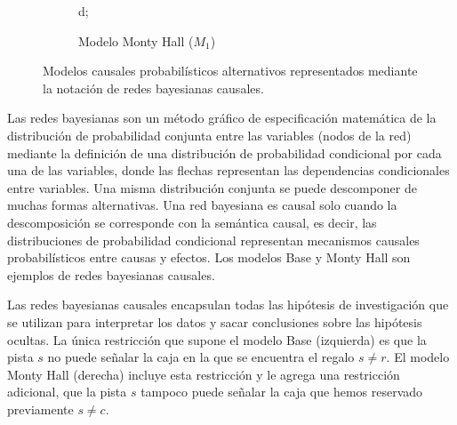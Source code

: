 \documentclass[a4paper,10pt]{article}
\begin{document}
\begin{figure}[H]
\begin{subfigure}[t]{0.48\textwidth}
{     {d};
}

\vspace{0.15cm}
\caption{Modelo Monty Hall ($M_1$)}
\end{subfigure}
\caption{Modelos causales probabilísticos alternativos representados mediante la notación de redes bayesianas causales.}
\label{fig_ModeloCausalesAlternativos}
\end{figure}

Las redes bayesianas son un método gráfico de especificación matemática de la distribución de probabilidad conjunta entre las variables (nodos de la red) mediante la definición de una distribución de probabilidad condicional por cada una de las variables, donde las flechas representan las dependencias condicionales entre variables.
%
Una misma distribución conjunta se puede descomponer de muchas formas alternativas.
%
Una red bayesiana es causal solo cuando la descomposición se corresponde con la semántica causal, es decir, las distribuciones de probabilidad condicional representan mecanismos causales probabilísticos entre causas y efectos.
%
Los modelos Base y Monty Hall son ejemplos de redes bayesianas causales.


Las redes bayesianas causales encapsulan todas las hipótesis de investigación que se utilizan para interpretar los datos y sacar conclusiones sobre las hipótesis ocultas.
%
La única restricción que supone el modelo Base (izquierda) es que la pista $s$ no puede señalar la caja en la que se encuentra el regalo $s\neq r$.
%
El modelo Monty Hall (derecha) incluye esta restricción y le agrega una restricción adicional, que la pista $s$ tampoco puede señalar la caja que hemos reservado previamente $s\neq c$.

\end{document}
